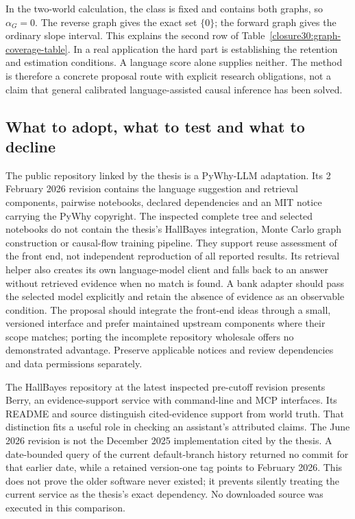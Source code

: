 In the two-world calculation, the class is fixed and contains both graphs,
so $\alpha_G=0$. The reverse graph gives the exact set $\{0\}$; the forward
graph gives the ordinary slope interval. This explains the second row of
Table~\ref{closure30:graph-coverage-table}. In a real application the hard
part is establishing the retention and estimation conditions. A language
score alone supplies neither. The method is therefore a concrete proposal
route with explicit research obligations, not a claim that general calibrated
language-assisted causal inference has been solved.

\subsection{What to adopt, what to test and what to decline}

The public repository linked by the thesis is a PyWhy-LLM adaptation. Its
2 February 2026 revision contains the language suggestion and retrieval
components, pairwise notebooks, declared dependencies and an MIT notice
carrying the PyWhy copyright. The inspected complete tree and selected
notebooks do not contain the thesis's HallBayes integration, Monte Carlo
graph construction or causal-flow training pipeline. They support reuse
assessment of the front end, not independent reproduction of all reported
results. Its retrieval helper also creates its own language-model client and
falls back to an answer without retrieved evidence when no match is found.
A bank adapter should pass the selected model explicitly and retain the
absence of evidence as an observable condition. The proposal should
integrate the front-end ideas through a small,
versioned interface and prefer maintained upstream components where their
scope matches; porting the incomplete repository wholesale offers no
demonstrated advantage. Preserve applicable notices and review dependencies
and data permissions separately.
\citep{closure30molerocode}

The HallBayes repository at the latest inspected pre-cutoff revision presents
Berry, an evidence-support service with command-line and MCP interfaces.
Its README and source distinguish cited-evidence support from world truth.
That distinction fits a useful role in checking an assistant's attributed
claims. The June 2026 revision is not the December 2025 implementation cited
by the thesis. A date-bounded query of the current default-branch history
returned no commit for that earlier date, while a retained version-one tag
points to February 2026. This does not prove the older software never
existed; it prevents silently treating the current service as the thesis's
exact dependency. No downloaded source was executed in this comparison.
\citep{closure30berry}

